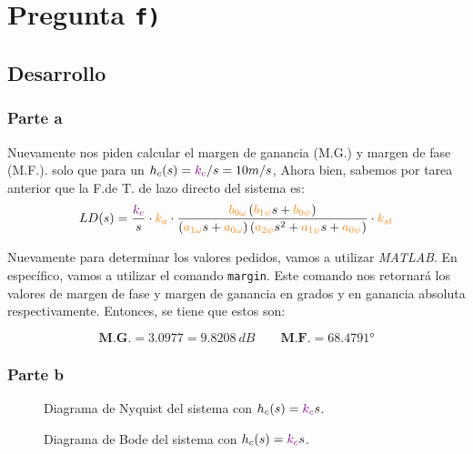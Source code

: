\section{Pregunta \texttt{f)}}\label{pregunta-f}


\subsection{Desarrollo}

\subsubsection{Parte a}
Nuevamente nos piden calcular el margen de ganancia (M.G.) y margen de fase
(M.F.). solo que para un \(h_c(s)= \mathbin{\color{violet}k_c}/s = 10m/s\), Ahora bien, sabemos 
por tarea anterior \cite{tarea-2-sdc} que la F.de T. de lazo directo del sistema es:
\begin{equation}
  LD(s) = \frac{\mora{k_c}}{s} \cdot \nara{k_a} \cdot \frac{\nara{b_{0\omega}} \left(\nara{b_{1\psi}}s + \nara{b_{0\psi}}\right)}
  {\left(\nara{a_{1\omega}}s + \nara{a_{0\omega}}\right)\left(\nara{a_{2\psi}}s^2 + \nara{a_{1\psi}}s + \nara{a_{0\psi}}\right)} \cdot \nara{k_{st}}
\end{equation}

Nuevamente para determinar los valores pedidos, vamos a utilizar  \textit{MATLAB}. En específico, vamos a utilizar el comando \texttt{margin}. Este comando nos retornará los valores de margen de fase y margen de ganancia en grados y en ganancia absoluta respectivamente. Entonces, se tiene que estos son:

\begin{equation}
  \boxed{\textbf{M.G.} = 3.0977 = 9.8208\ \unit{dB}} \qquad \boxed{\textbf{M.F.} = \ang{68.4791}}
\end{equation}


\subsubsection{Parte b}

\begin{figure}[h]
  \centering
  
  \caption{Diagrama de Nyquist del sistema con $h_{c}(s) = \mathbin{\color{violet}k_{c}}\mathbin{s}$.}
  \label{fig:nyquist-f1}
\end{figure}

\begin{figure}[h]
  \centering
  
  \caption{Diagrama de Bode del sistema con $h_{c}(s) = \mathbin{\color{violet}k_{c}}\mathbin{s}$.}
  \label{fig:bode-f1}
\end{figure}

